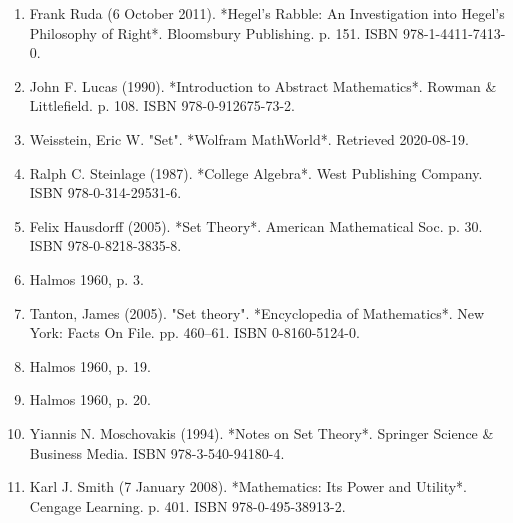 \begin{enumerate}
\item Frank Ruda (6 October 2011). *Hegel's Rabble: An Investigation into Hegel's Philosophy of Right*. Bloomsbury Publishing. p. 151. ISBN 978-1-4411-7413-0.  
\item John F. Lucas (1990). *Introduction to Abstract Mathematics*. Rowman & Littlefield. p. 108. ISBN 978-0-912675-73-2.  
\item Weisstein, Eric W. "Set". *Wolfram MathWorld*. Retrieved 2020-08-19.  
\item Ralph C. Steinlage (1987). *College Algebra*. West Publishing Company. ISBN 978-0-314-29531-6.  
\item Felix Hausdorff (2005). *Set Theory*. American Mathematical Soc. p. 30. ISBN 978-0-8218-3835-8.  
\item Halmos 1960, p. 3.  
\item Tanton, James (2005). "Set theory". *Encyclopedia of Mathematics*. New York: Facts On File. pp. 460–61. ISBN 0-8160-5124-0.  
\item Halmos 1960, p. 19.  
\item Halmos 1960, p. 20.  
\item Yiannis N. Moschovakis (1994). *Notes on Set Theory*. Springer Science & Business Media. ISBN 978-3-540-94180-4.  
\item Karl J. Smith (7 January 2008). *Mathematics: Its Power and Utility*. Cengage Learning. p. 401. ISBN 978-0-495-38913-2.  
\end{enumerate}
